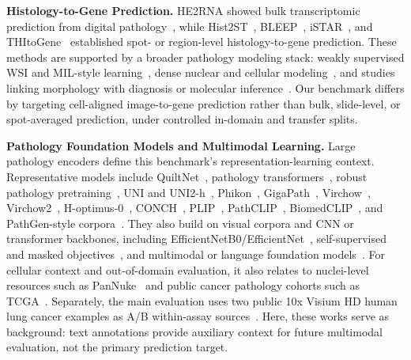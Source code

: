 \documentclass{article}
\begin{document}
\noindent\textbf{Histology-to-Gene Prediction.}
HE2RNA showed bulk transcriptomic prediction from digital pathology~\cite{pronier2020he2rna}, while Hist2ST~\cite{zeng2022spatial}, BLEEP~\cite{xie2023spatially}, iSTAR~\cite{zhang2024inferring}, and THItoGene~\cite{jia2024thitogene} established spot- or region-level histology-to-gene prediction. These methods are supported by a broader pathology modeling stack: weakly supervised WSI and MIL-style learning~\cite{campanella2019clinical,lu2021data,shao2021transmil,ciga2022self,ilse2018attention}, dense nuclear and cellular modeling~\cite{ronneberger2015unet,graham2019hover,horst2024cellvit}, and studies linking morphology with diagnosis or molecular inference~\cite{bejnordi2017diagnostic,wang2016deep,komura2018machine,kather2019deep}. Our benchmark differs by targeting cell-aligned image-to-gene prediction rather than bulk, slide-level, or spot-averaged prediction, under controlled in-domain and transfer splits.

\noindent\textbf{Pathology Foundation Models and Multimodal Learning.}
Large pathology encoders define this benchmark's representation-learning context. Representative models include QuiltNet~\cite{ikezogwo2023quilt1m}, pathology transformers~\cite{wang2022transformer}, robust pathology pretraining~\cite{azizi2023robust}, UNI and UNI2-h~\cite{chen2024uni,mahmoodlab_uni2h}, Phikon~\cite{filiot2024phikon}, GigaPath~\cite{xu2024whole}, Virchow~\cite{vorontsov2023virchow}, Virchow2~\cite{zimmermann2024virchow2}, H-optimus-0~\cite{hoptimus0}, CONCH~\cite{lu2024visual}, PLIP~\cite{huang2023visual}, PathCLIP~\cite{he2024pathclip}, BiomedCLIP~\cite{zhang2023biomedclip}, and PathGen-style corpora~\cite{sun2024pathgen}. They also build on visual corpora and CNN or transformer backbones, including EfficientNetB0/EfficientNet~\cite{deng2009imagenet,lin2014microsoft,he2016deep,koonce2021resnet,simonyan2015very,szegedy2015going,tan2019efficientnet,dosovitskiy2021image,touvron2021training,liu2021swin,liu2022convnet}, self-supervised and masked objectives~\cite{he2020momentum,chen2020simple,grill2020bootstrap,zbontar2021barlow,caron2018deep,caron2020unsupervised,chen2021exploring,caron2021emerging,oquab2023dinov2,he2022masked,baevski2022data2vec}, and multimodal or language foundation models~\cite{radford2021learning,devlin2019bert,raffel2020exploring,achiam2023gpt4,bommasani2021opportunities,koh2021wilds}. For cellular context and out-of-domain evaluation, it also relates to nuclei-level resources such as PanNuke~\cite{gamper2020pannuke} and public cancer pathology cohorts such as TCGA~\cite{weinstein2013cancer}. Separately, the main evaluation uses two public 10x Visium HD human lung cancer examples as A/B within-assay sources~\cite{tenx_visium_hd_postx_lung_ffpe,tenx_visium_hd_lung_fixed_frozen}. Here, these works serve as background: text annotations provide auxiliary context for future multimodal evaluation, not the primary prediction target.
\end{document}
